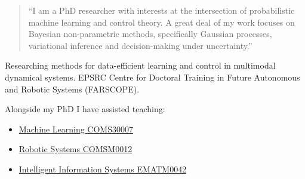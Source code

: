 \documentclass[10pt,a4paper,ragged2e,withhyper]{altacv}
\author{Aidan Scannell}
\date{\today}
\title{}
\begin{document}

\makecvheader

\begin{paracol}{2}
\begin{quote}
``I am a PhD researcher with interests at the intersection of probabilistic machine learning and control theory. A great deal of my work focuses on Bayesian non-parametric methods, specifically Gaussian processes, variational inference and decision-making under uncertainty.''
\end{quote}
\label{sec:org7b1321e}

Researching methods for data-efficient learning and control in multimodal dynamical systems. EPSRC Centre for Doctoral Training in Future Autonomous and Robotic Systems (FARSCOPE).


\par\divider
{}

Alongside my PhD I have assisted teaching:
\begin{itemize}
\item \href{https://www.bris.ac.uk/unit-programme-catalogue/UnitDetails.jsa?ayrCode=19\%2F20\&unitCode=COMS30007}{Machine Learning COMS30007}
\item \href{https://www.bris.ac.uk/unit-programme-catalogue/UnitDetails.jsa?ayrCode=19\%2F20\&unitCode=COMSM0012}{Robotic Systems COMSM0012}
\item \href{https://www.bris.ac.uk/unit-programme-catalogue/UnitDetails.jsa?ayrCode=19/20\\\&unitCode=EMATM0042}{Intelligent Information Systems EMATM0042}
\end{itemize}


\label{sec:org3ef913f}
\nocite{*}
\printbibliography[heading=pubtype,title={\printinfo{\faUsers}{Conference Proceedings}},type=inproceedings]


\end{paracol}
\end{document}
